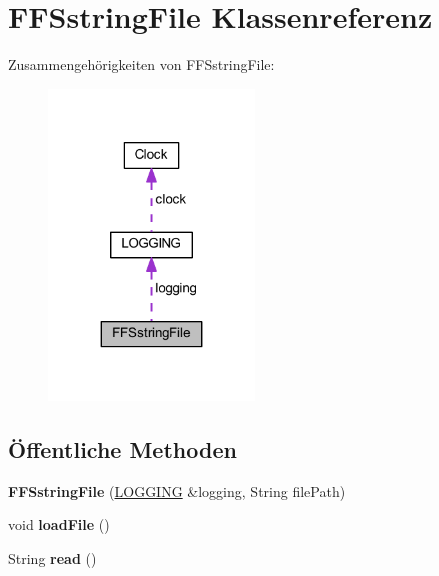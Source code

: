 \hypertarget{class_f_f_sstring_file}{}\section{F\+F\+Sstring\+File Klassenreferenz}
\label{class_f_f_sstring_file}


Zusammengehörigkeiten von F\+F\+Sstring\+File\+:\nopagebreak
\begin{figure}[H]
\begin{center}
\leavevmode
\includegraphics[width=155pt]{class_f_f_sstring_file__coll__graph}
\end{center}
\end{figure}
\subsection*{Öffentliche Methoden}
\begin{DoxyCompactItemize}
\item 
\mbox{\label{class_f_f_sstring_file_aa5d7d691833c08b78a6fe1417bc405b7}} 
{\bfseries F\+F\+Sstring\+File} (\hyperlink{class_l_o_g_g_i_n_g}{L\+O\+G\+G\+I\+NG} \&logging, String file\+Path)
\item 
\mbox{\label{class_f_f_sstring_file_a4ba9dc7c294994f6530475a6b5748ca5}} 
void {\bfseries load\+File} ()
\item 
\mbox{\label{class_f_f_sstring_file_a83bdfffdcd8db1c924402997c0ed5b4e}} 
String {\bfseries read} ()
\end{DoxyCompactItemize}
